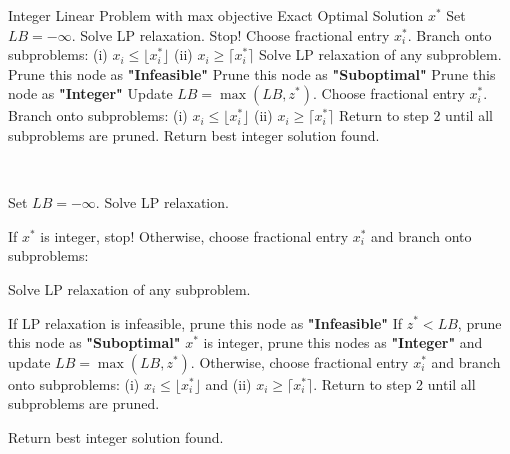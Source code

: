 \begin{algorithm}[H]
\caption{Branch and Bound - Maximization}\label{alg:branch-and-bound-max}
\begin{algorithmic}[1]
    \Require Integer Linear Problem with max objective
    \Ensure Exact Optimal Solution $x^*$
    \State Set $LB = - \infty$.
    \State Solve LP relaxation. 
        \State Stop!
    \Else
        \State Choose fractional entry $x_i^*$.
        \State Branch onto subproblems:
        \Statex \hspace{2em} (i) $x_i \leq \lfloor x^*_i \rfloor$
        \Statex \hspace{2em} (ii) $x_i \geq \lceil x^*_i \rceil$
    \EndIf
    \State Solve LP relaxation of any subproblem.
        \State Prune this node as \textbf{"Infeasible"}
        \State Prune this node as \textbf{"Suboptimal"}
        \State Prune this node as \textbf{"Integer"}
        \State Update $LB = \max(LB, z^*)$.
    \Else
        \State Choose fractional entry $x_i^*$.
        \State Branch onto subproblems:
        \Statex \hspace{2em} (i) $x_i \leq \lfloor x^*_i \rfloor$
        \Statex \hspace{2em} (ii) $x_i \geq \lceil x^*_i \rceil$
        \State Return to step 2 until all subproblems are pruned.
    \EndIf
    \State Return best integer solution found.
\end{algorithmic}
\end{algorithm}

\begin{algorithm}[H]
\\
\caption{Branch and Bound - Maximization}\label{alg:branch-and-bound-max}
\begin{algorithmic}[1]
\State Set $LB = - \infty$.
\State Solve LP relaxation. 
\begin{algsubstates}
\State If $x^*$ is integer, stop!
\State Otherwise, choose fractional entry $x_i^*$ and branch onto subproblems:
\end{algsubstates}
\State Solve LP relaxation of any subproblem.
\begin{algsubstates}
\State If LP relaxation is infeasible, prune this node as \textbf{"Infeasible"}
\State If $z^* < LB$, prune this node as \textbf{"Suboptimal"}
\State $x^*$ is integer, prune this nodes as \textbf{"Integer"} and update $LB = \max(LB, z^*)$.
\State Otherwise, choose fractional entry $x_i^*$ and branch onto subproblems:  (i) $x_i \leq \lfloor x^*_i \rfloor$ and (ii) $x_i \geq \lceil x^*_i \rceil$.     Return to step 2 until all subproblems are pruned.
\end{algsubstates}
\State Return best integer solution found.
\end{algorithmic}
\end{algorithm}

